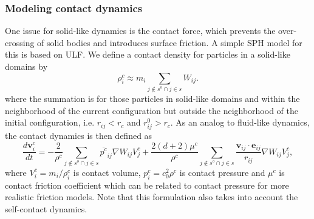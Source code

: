 \documentclass[12pt, a4paper,onecolumn]{article}
\begin{document}
\subsubsection{Modeling contact dynamics}
One issue for solid-like dynamics is the contact force, 
which prevents the over-crossing of solid bodies and introduces surface friction. 
A simple SPH model for this is based on ULF. 
We define a contact density for particles in a solid-like domains by 
%
\begin{equation}
\rho^{c}_i \approx  m_i\sum_{j\notin s^{o} \cap j\in s}  W_{ij}. 
\label{particle-density-conatct}
\end{equation}
%
where the summation is for those particles in solid-like domains and within the neighborhood of the current configuration 
but outside the neighborhood of the initial configuration, 
i.e. $r_{ij} < r_c$ and $r^{0}_{ij} > r_c$. 
As an analog to fluid-like dynamics, the contact dynamics is then defined as
%
\begin{equation}\label{momentum-conservation-contact}
\frac{d \mathbf{v}^{c}_{i}}{d t}  = -\frac{2}{\rho^{c}}\sum_{j\notin s^{o} \cap j\in s}  \overline{p^{c}}_{ij} \nabla W_{ij} V^{c}_j + \frac{2(d+2) \mu^{c}}{\rho^{c}}\sum_{j\notin s^{o} \cap j\in s}\frac{\mathbf{v}_{ij}\cdot \mathbf{e}_{ij}}{r_{ij}} \nabla W_{ij}  V^{c}_j, 
\end{equation}
%
where $V^{c}_i = m_i/\rho^{c}_i$ is contact volume, $p^{c}_{i}= c^2_0 \rho^{c}$ is contact pressure and $\mu^{c}$ is contact friction coefficient 
which can be related to contact pressure for more realistic friction models.
Note that this formulation also takes into account the self-contact dynamics.
%
\end{document}
